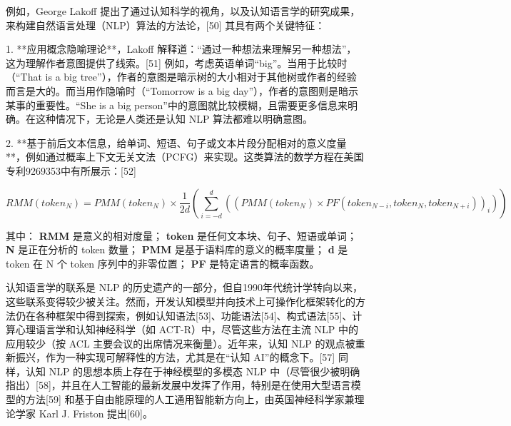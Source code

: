 例如，George Lakoff 提出了通过认知科学的视角，以及认知语言学的研究成果，来构建自然语言处理（NLP）算法的方法论，[50] 其具有两个关键特征：

1. **应用概念隐喻理论**，Lakoff 解释道：“通过一种想法来理解另一种想法”，这为理解作者意图提供了线索。[51] 例如，考虑英语单词“big”。当用于比较时（“That is a big tree”），作者的意图是暗示树的大小相对于其他树或作者的经验而言是大的。而当用作隐喻时（“Tomorrow is a big day”），作者的意图则是暗示某事的重要性。“She is a big person”中的意图就比较模糊，且需要更多信息来明确。在这种情况下，无论是人类还是认知 NLP 算法都难以明确意图。

2. **基于前后文本信息，给单词、短语、句子或文本片段分配相对的意义度量**，例如通过概率上下文无关文法（PCFG）来实现。这类算法的数学方程在美国专利9269353中有所展示：[52]  
   
   \[
   RMM(token_{N}) = PMM(token_{N}) \times \frac{1}{2d} \left( \sum_{i=-d}^{d} \left( (PMM(token_{N}) \times PF(token_{N-i}, token_{N}, token_{N+i}))_i \right) \right)~
   \]

   其中：
  \textbf{RMM} 是意义的相对度量；
  \textbf{token} 是任何文本块、句子、短语或单词；
  \textbf{N} 是正在分析的 token 数量；
  \textbf{PMM} 是基于语料库的意义的概率度量；
  \textbf{d} 是 token 在 N 个 token 序列中的非零位置；
  \textbf{PF} 是特定语言的概率函数。

认知语言学的联系是 NLP 的历史遗产的一部分，但自1990年代统计学转向以来，这些联系变得较少被关注。然而，开发认知模型并向技术上可操作化框架转化的方法仍在各种框架中得到探索，例如认知语法[53]、功能语法[54]、构式语法[55]、计算心理语言学和认知神经科学（如 ACT-R）中，尽管这些方法在主流 NLP 中的应用较少（按 ACL 主要会议的出席情况来衡量）。近年来，认知 NLP 的观点被重新振兴，作为一种实现可解释性的方法，尤其是在“认知 AI”的概念下。[57] 同样，认知 NLP 的思想本质上存在于神经模型的多模态 NLP 中（尽管很少被明确指出）[58]，并且在人工智能的最新发展中发挥了作用，特别是在使用大型语言模型的方法[59] 和基于自由能原理的人工通用智能新方向上，由英国神经科学家兼理论学家 Karl J. Friston 提出[60]。
